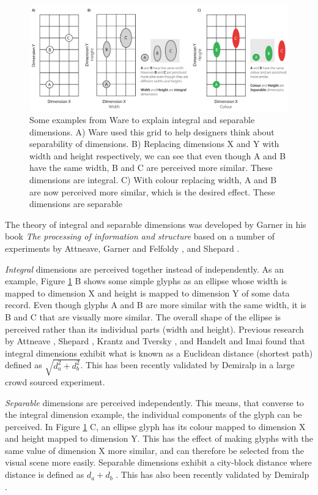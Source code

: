  \begin{figure}[t!]
\includegraphics[width=\textwidth]{images/related-work/integral_separable}
\caption{Some examples from Ware \cite{ware13} to explain integral and separable dimensions. A) Ware \cite{ware13} used this grid to help designers think about separability of dimensions. B) Replacing dimensions X and Y with width and height respectively, we can see that even though A and B have the same width, B and C are perceived more similar. These dimensions are integral. C) With colour replacing width, A and B are now perceived more similar, which is the desired effect. These dimensions are separable}
\label{fig:integral_separable}
\end{figure}

The theory of integral and separable dimensions was developed by Garner \cite{garner1974processing} in his book \emph{The processing of information and structure} based on a number of experiments by Attneave\cite{attneave1950dimensions}, Garner and Felfoldy \cite{garner1970integrality}, and Shepard \cite{shepard64}.

\emph{Integral} dimensions are perceived together instead of independently. 
As an example, Figure \ref{fig:integral_separable} B shows some simple glyphs as an ellipse whose width is mapped to dimension X and height is mapped to dimension Y of some data record. 
Even though glyphs A and B are more similar with the same width, it is B and C that are visually more similar. 
The overall shape of the ellipse is perceived rather than its individual parts (width and height).  
Previous research by Attneave \cite{attneave1950dimensions}, Shepard \cite{shepard64}, Krantz and Tversky \cite{krantz75}, and Handelt and Imai \cite{handelt72} found that integral dimensions exhibit what is known as a Euclidean distance (shortest path) defined as $\sqrt{d^2_a + d^2_b}$.
This has been recently validated by Demiralp \etal \cite{demiralplearning} in a large crowd sourced experiment.

\emph{Separable} dimensions are perceived independently.
This means, that converse to the integral dimension example, the individual components of the glyph can be perceived. 
In Figure \ref{fig:integral_separable} C, an ellipse glyph has its colour mapped to dimension X and height mapped to dimension Y. 
This has the effect of making glyphs with the same value of dimension X more similar, and can therefore be selected from the visual scene more easily.
Separable dimensions exhibit a city-block distance where distance is defined as $d_a  + d_b$ \cite{burns78,shepard64}.
This has also been recently validated by Demiralp \etal \cite{demiralplearning}.


